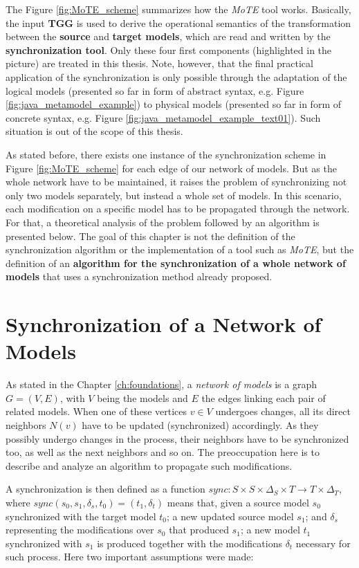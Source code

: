 \documentclass[tuberlin,cic,tc,english,noabntcite,oneside]{iiufrgs}
\begin{document}
The Figure \ref{fig:MoTE_scheme} summarizes how the \emph{MoTE} tool works. Basically, the input \textbf{TGG} is used to derive the operational semantics of the transformation between the \textbf{source} and \textbf{target models}, which are read and written by the \textbf{synchronization tool}. Only these four first components (highlighted in the picture) are treated in this thesis. Note, however, that the final practical application of the synchronization is only possible through the adaptation of the logical models (presented so far in form of abstract syntax, e.g. Figure \ref{fig:java_metamodel_example}) to physical models (presented so far in form of concrete syntax, e.g. Figure \ref{fig:java_metamodel_example_text01}). Such situation is out of the scope of this thesis. 

As stated before, there exists one instance of the synchronization scheme in Figure \ref{fig:MoTE_scheme} for each edge of our network of models. But as the whole network have to be maintained, it raises the problem of synchronizing not only two models separately, but instead a whole set of models. In this scenario, each modification on a specific model has to be propagated through the network. For that, a theoretical analysis of the problem followed by an algorithm is presented below. The goal of this chapter is not the definition of the synchronization algorithm or the implementation of a tool such as \emph{MoTE}, but the definition of an \textbf{algorithm for the synchronization of a whole network of models} that uses a synchronization method already proposed.

\section{Synchronization of a Network of Models}
As stated in the Chapter \ref{ch:foundations}, a \emph{network of models} is a graph $G = (V,E)$, with $V$ being the models and $E$ the edges linking each pair of related models. When one of these vertices $v \in V$ undergoes changes, all its direct neighbors $N(v)$ have to be updated (synchronized) accordingly. As they possibly undergo changes in the process, their neighbors have to be synchronized too, as well as the next neighbors and so on. The preoccupation here is to describe and analyze an algorithm to propagate such modifications.

A synchronization is then defined as a function $sync: S \times S \times \Delta_S \times T \rightarrow T \times \Delta_T$, where $sync (s_0, s_1, \delta_s, t_0) = (t_1, \delta_t)$ means that, given a source model $s_0$ synchronized with the target model $t_0$; a new updated source model $s_1$; and $\delta_s$ representing the modifications over $s_0$ that produced $s_1$; a new model $t_1$ synchronized with $s_1$ is produced together with the modifications $\delta_t$ necessary for such process. Here two important assumptions were made:
\end{document}
